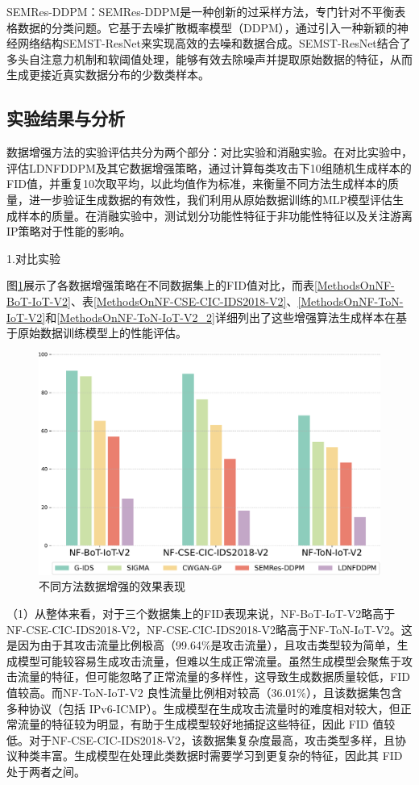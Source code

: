 \documentclass[promaster]{thesis-uestc}
\begin{document}
SEMRes-DDPM：SEMRes-DDPM是一种创新的过采样方法，专门针对不平衡表格数据的分类问题。它基于去噪扩散概率模型（DDPM），通过引入一种新颖的神经网络结构SEMST-ResNet来实现高效的去噪和数据合成。SEMST-ResNet结合了多头自注意力机制和软阈值处理，能够有效去除噪声并提取原始数据的特征，从而生成更接近真实数据分布的少数类样本。
\subsection{实验结果与分析}

数据增强方法的实验评估共分为两个部分：对比实验和消融实验。在对比实验中，评估LDNFDDPM及其它数据增强策略，通过计算每类攻击下10组随机生成样本的FID值，并重复10次取平均，以此均值作为标准，来衡量不同方法生成样本的质量，进一步验证生成数据的有效性，我们利用从原始数据训练的MLP模型评估生成样本的质量。在消融实验中，测试划分功能性特征于非功能性特征以及关注游离IP策略对于性能的影响。

1.对比实验

图\ref{FID}展示了各数据增强策略在不同数据集上的FID值对比，而表\ref{MethodsOnNF-BoT-IoT-V2}、表\ref{MethodsOnNF-CSE-CIC-IDS2018-V2}、\ref{MethodsOnNF-ToN-IoT-V2}和\ref{MethodsOnNF-ToN-IoT-V2_2}详细列出了这些增强算法生成样本在基于原始数据训练模型上的性能评估。

\begin{figure}[h!]
    \centering
    \includegraphics[width=1\linewidth]{./pic/chart1.pdf}
    \caption{不同方法数据增强的效果表现}
    \label{FID}
\end{figure}
（1）从整体来看，对于三个数据集上的FID表现来说，NF-BoT-IoT-V2略高于NF-CSE-CIC-IDS2018-V2，NF-CSE-CIC-IDS2018-V2略高于NF-ToN-IoT-V2。这是因为由于其攻击流量比例极高（99.64\%是攻击流量），且攻击类型较为简单，生成模型可能较容易生成攻击流量，但难以生成正常流量。虽然生成模型会聚焦于攻击流量的特征，但可能忽略了正常流量的多样性，这导致生成数据质量较低，FID 值较高。而NF-ToN-IoT-V2 良性流量比例相对较高（36.01\%），且该数据集包含多种协议（包括 IPv6-ICMP）。生成模型在生成攻击流量时的难度相对较大，但正常流量的特征较为明显，有助于生成模型较好地捕捉这些特征，因此 FID 值较低。对于NF-CSE-CIC-IDS2018-V2，该数据集复杂度最高，攻击类型多样，且协议种类丰富。生成模型在处理此类数据时需要学习到更复杂的特征，因此其 FID 处于两者之间。
\end{document}
